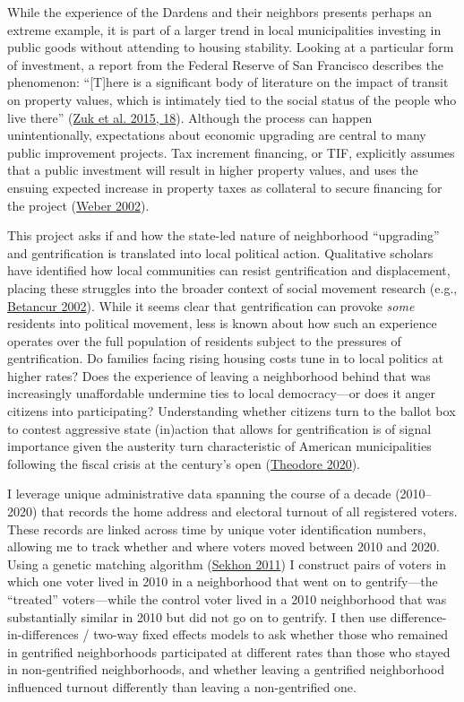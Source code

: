 \documentclass[
  12pt,
]{article}
\begin{document}
While the experience of the Dardens and their neighbors presents perhaps an extreme example, it is part of a larger trend in local municipalities investing in public goods without attending to housing stability. Looking at a particular form of investment, a report from the Federal Reserve of San Francisco describes the phenomenon: ``{[}T{]}here is a significant body of literature on the impact of transit on property values, which is intimately tied to the social status of the people who live there'' (\protect\hyperlink{ref-Zuk2015}{Zuk et al. 2015, 18}). Although the process can happen unintentionally, expectations about economic upgrading are central to many public improvement projects. Tax increment financing, or TIF, explicitly assumes that a public investment will result in higher property values, and uses the ensuing expected increase in property taxes as collateral to secure financing for the project (\protect\hyperlink{ref-Weber2002}{Weber 2002}).

This project asks if and how the state-led nature of neighborhood ``upgrading'' and gentrification is translated into local political action. Qualitative scholars have identified how local communities can resist gentrification and displacement, placing these struggles into the broader context of social movement research (e.g., \protect\hyperlink{ref-Betancur2002}{Betancur 2002}). While it seems clear that gentrification can provoke \emph{some} residents into political movement, less is known about how such an experience operates over the full population of residents subject to the pressures of gentrification. Do families facing rising housing costs tune in to local politics at higher rates? Does the experience of leaving a neighborhood behind that was increasingly unaffordable undermine ties to local democracy---or does it anger citizens into participating? Understanding whether citizens turn to the ballot box to contest aggressive state (in)action that allows for gentrification is of signal importance given the austerity turn characteristic of American municipalities following the fiscal crisis at the century's open (\protect\hyperlink{ref-Theodore2020}{Theodore 2020}).

I leverage unique administrative data spanning the course of a decade (2010--2020) that records the home address and electoral turnout of all registered voters. These records are linked across time by unique voter identification numbers, allowing me to track whether and where voters moved between 2010 and 2020. Using a genetic matching algorithm (\protect\hyperlink{ref-Sekhon2011}{Sekhon 2011}) I construct pairs of voters in which one voter lived in 2010 in a neighborhood that went on to gentrify---the ``treated'' voters---while the control voter lived in a 2010 neighborhood that was substantially similar in 2010 but did not go on to gentrify. I then use difference-in-differences / two-way fixed effects models to ask whether those who remained in gentrified neighborhoods participated at different rates than those who stayed in non-gentrified neighborhoods, and whether leaving a gentrified neighborhood influenced turnout differently than leaving a non-gentrified one.
\end{document}
